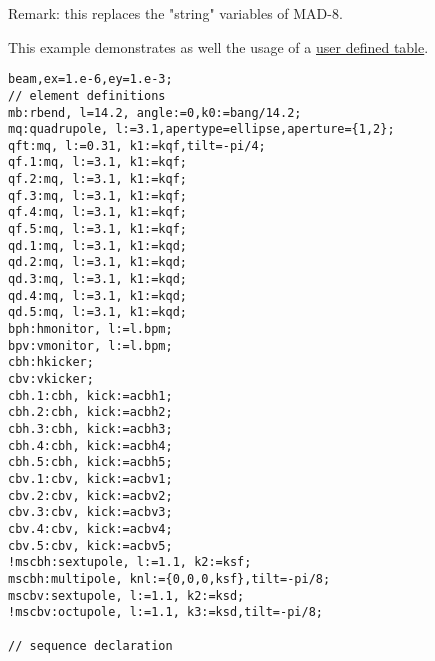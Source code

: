 Remark: this replaces the "string" variables of MAD-8. 

 This example demonstrates as well the usage of a \href{ucreate}{user defined table}. 
\begin{verbatim}
beam,ex=1.e-6,ey=1.e-3;
// element definitions
mb:rbend, l=14.2, angle:=0,k0:=bang/14.2;
mq:quadrupole, l:=3.1,apertype=ellipse,aperture={1,2};
qft:mq, l:=0.31, k1:=kqf,tilt=-pi/4;
qf.1:mq, l:=3.1, k1:=kqf;
qf.2:mq, l:=3.1, k1:=kqf;
qf.3:mq, l:=3.1, k1:=kqf;
qf.4:mq, l:=3.1, k1:=kqf;
qf.5:mq, l:=3.1, k1:=kqf;
qd.1:mq, l:=3.1, k1:=kqd;
qd.2:mq, l:=3.1, k1:=kqd;
qd.3:mq, l:=3.1, k1:=kqd;
qd.4:mq, l:=3.1, k1:=kqd;
qd.5:mq, l:=3.1, k1:=kqd;
bph:hmonitor, l:=l.bpm;
bpv:vmonitor, l:=l.bpm;
cbh:hkicker;
cbv:vkicker;
cbh.1:cbh, kick:=acbh1;
cbh.2:cbh, kick:=acbh2;
cbh.3:cbh, kick:=acbh3;
cbh.4:cbh, kick:=acbh4;
cbh.5:cbh, kick:=acbh5;
cbv.1:cbv, kick:=acbv1;
cbv.2:cbv, kick:=acbv2;
cbv.3:cbv, kick:=acbv3;
cbv.4:cbv, kick:=acbv4;
cbv.5:cbv, kick:=acbv5;
!mscbh:sextupole, l:=1.1, k2:=ksf;
mscbh:multipole, knl:={0,0,0,ksf},tilt=-pi/8;
mscbv:sextupole, l:=1.1, k2:=ksd;
!mscbv:octupole, l:=1.1, k3:=ksd,tilt=-pi/8;

// sequence declaration


\end{verbatim}
